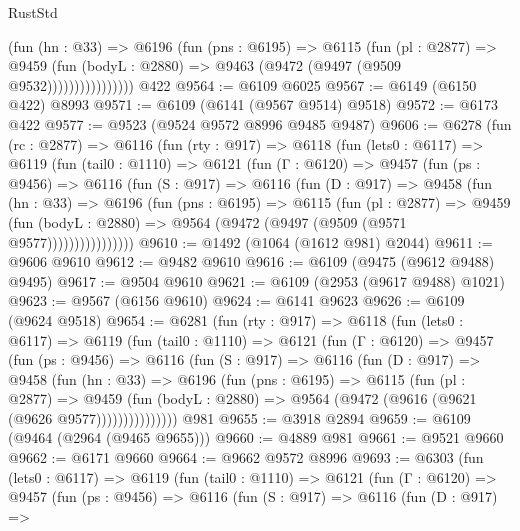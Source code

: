 \begin{lexlean}{RustStd}
\begin{coremodule}
                      (fun (hn : @33) =>
                      @6196
                        (fun (pns : @6195) =>
                        @6115
                          (fun (pl : @2877) =>
                          @9459
                            (fun (bodyL : @2880) => @9463 (@9472 (@9497 (@9509 @9532))))))))))))))))
    @422
@9564 := @6109 @6025
@9567 := @6149 (@6150 @422) @8993
@9571 := @6109 (@6141 (@9567 @9514) @9518)
@9572 := @6173 @422
@9577 := @9523 (@9524 @9572 @8996 @9485 @9487)
@9606 := @6278
    (fun (rc : @2877) =>
    @6116
      (fun (rty : @917) =>
      @6118
        (fun (lets0 : @6117) =>
        @6119
          (fun (tail0 : @1110) =>
          @6121
            (fun (Γ : @6120) =>
            @9457
              (fun (ps : @9456) =>
              @6116
                (fun (S : @917) =>
                @6116
                  (fun (D : @917) =>
                  @9458
                    (fun (hn : @33) =>
                    @6196
                      (fun (pns : @6195) =>
                      @6115
                        (fun (pl : @2877) =>
                        @9459
                          (fun (bodyL : @2880) =>
                          @9564 (@9472 (@9497 (@9509 (@9571 @9577))))))))))))))))
@9610 := @1492 (@1064 (@1612 @981) @2044)
@9611 := @9606 @9610
@9612 := @9482 @9610
@9616 := @6109 (@9475 (@9612 @9488) @9495)
@9617 := @9504 @9610
@9621 := @6109 (@2953 (@9617 @9488) @1021)
@9623 := @9567 (@6156 @9610)
@9624 := @6141 @9623
@9626 := @6109 (@9624 @9518)
@9654 := @6281
    (fun (rty : @917) =>
    @6118
      (fun (lets0 : @6117) =>
      @6119
        (fun (tail0 : @1110) =>
        @6121
          (fun (Γ : @6120) =>
          @9457
            (fun (ps : @9456) =>
            @6116
              (fun (S : @917) =>
              @6116
                (fun (D : @917) =>
                @9458
                  (fun (hn : @33) =>
                  @6196
                    (fun (pns : @6195) =>
                    @6115
                      (fun (pl : @2877) =>
                      @9459
                        (fun (bodyL : @2880) =>
                        @9564 (@9472 (@9616 (@9621 (@9626 @9577)))))))))))))))
    @981
@9655 := @3918 @2894
@9659 := @6109 (@9464 (@2964 (@9465 @9655)))
@9660 := @4889 @981
@9661 := @9521 @9660
@9662 := @6171 @9660
@9664 := @9662 @9572 @8996
@9693 := @6303
    (fun (lets0 : @6117) =>
    @6119
      (fun (tail0 : @1110) =>
      @6121
        (fun (Γ : @6120) =>
        @9457
          (fun (ps : @9456) =>
          @6116
            (fun (S : @917) =>
            @6116
              (fun (D : @917) =>

\end{coremodule}
\end{lexlean}
